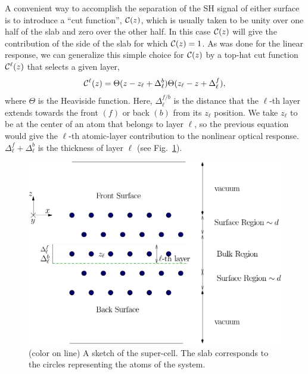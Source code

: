 \documentclass[floatfix,prb,aps,superscriptaddress,11pt,preprint,letterpaper]{revtex4}
\begin{document}
A convenient way to accomplish the separation of the SH signal of
either surface is to introduce a ``cut function'', ${\mathbf{\cal C}}(z)$, which is 
usually taken to be unity over one half of the slab and zero over 
the other half.\cite{reiningPRB94}
In this case ${\mathbf{\cal C}}(z)$ will give the contribution of the 
side of the slab for which ${\mathbf{\cal C}}(z)=1$. 
As was done for the linear response,\cite{mendozaPRB06}
we can generalize this 
simple choice for ${\mathbf{\cal C}}(z)$ by a top-hat cut function
${\mathbf{\cal C}}^\ell(z)$ that selects a given layer,
\begin{equation}
\label{sz}
{\mathbf{\cal C}}^\ell(z)=\Theta(z-z_\ell+\Delta_\ell^{b})  
            \Theta(z_\ell-z+\Delta_\ell^f),
\end{equation} 
where $\Theta$ is the Heaviside function. Here, $\Delta_\ell^{f/b}$
is the distance that the $\ell$-th layer extends towards the front
$(f)$ or back $(b)$ from its $z_\ell$ position. 
We take $z_\ell$ to be at the center of an atom that 
belongs to layer $\ell$, so the previous
equation would give the $\ell$-th atomic-layer 
contribution to the nonlinear optical response.
$\Delta_\ell^f+\Delta_\ell^b$ is the thickness of layer $\ell$ 
(see Fig.~\ref{fslab}).
\begin{figure}
\centering
\includegraphics[scale=.7]{images/slab}
\caption{(color on line) A sketch of the super-cell. 
The slab corresponds to the
circles representing the atoms of the system.\label{fslab}} 
\end{figure}
\end{document}

